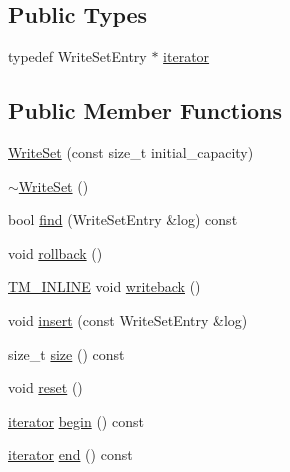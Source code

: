 \subsection*{Public Types}
\begin{DoxyCompactItemize}
\item 
typedef Write\-Set\-Entry $\ast$ \hyperlink{classstm_1_1WriteSet_ae874ad5e1b7d40809b9ec56d9f2c45e5}{iterator}
\end{DoxyCompactItemize}
\subsection*{Public Member Functions}
\begin{DoxyCompactItemize}
\item 
\hyperlink{classstm_1_1WriteSet_a586a04efca9aaa1bbc5784dbaec10911}{Write\-Set} (const size\-\_\-t initial\-\_\-capacity)
\item 
\hyperlink{classstm_1_1WriteSet_a6ad60eb006afa657ca6a75f3a041e769}{$\sim$\-Write\-Set} ()
\item 
bool \hyperlink{classstm_1_1WriteSet_a72a722df5366f2d1a9d3cafec55c3e3d}{find} (Write\-Set\-Entry \&log) const 
\item 
void \hyperlink{classstm_1_1WriteSet_ace0478cd45b33cbde4173a9d872c92ff}{rollback} ()
\item 
\hyperlink{platform_8hpp_abdc8d70d196a73a2a119efdbe674ecf8}{T\-M\-\_\-\-I\-N\-L\-I\-N\-E} void \hyperlink{classstm_1_1WriteSet_a3582722fbf74802622d36eb72f06f097}{writeback} ()
\item 
void \hyperlink{classstm_1_1WriteSet_a2ffbc9c42afe51ca6322610b1a86a604}{insert} (const Write\-Set\-Entry \&log)
\item 
size\-\_\-t \hyperlink{classstm_1_1WriteSet_a25770525f9ae49bb6feded1af5d8753c}{size} () const 
\item 
void \hyperlink{classstm_1_1WriteSet_a94850cf0782213e633f3946e2a783ef9}{reset} ()
\item 
\hyperlink{classstm_1_1WriteSet_ae874ad5e1b7d40809b9ec56d9f2c45e5}{iterator} \hyperlink{classstm_1_1WriteSet_a1919c8cb74b0f5b04343fb727cf73d78}{begin} () const 
\item 
\hyperlink{classstm_1_1WriteSet_ae874ad5e1b7d40809b9ec56d9f2c45e5}{iterator} \hyperlink{classstm_1_1WriteSet_a5672641edae35fceadfe4d9c47396025}{end} () const 
\end{DoxyCompactItemize}
